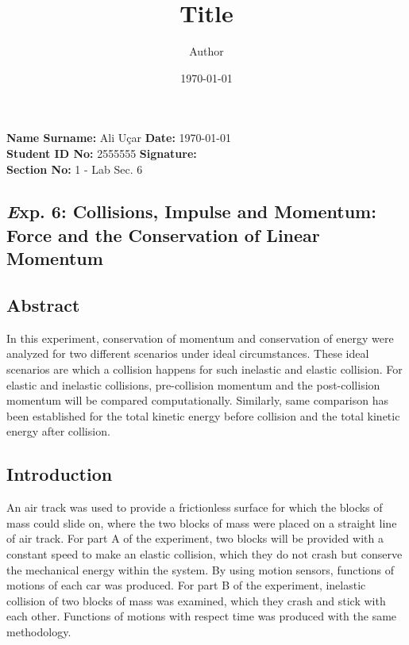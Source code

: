 \documentclass[a4paper, 12pt]{article}
\newcommand{\head}[1]{\section{\normalsize \textit #1}}
\newcommand{\subhead}[1]{\subsection{\normalsize #1}}
\begin{document}
    \title{Title}
    \author{Author}
    \date{\today}

    \noindent
    \textbf{Name Surname:} Ali Uçar
    \hfill \textbf{Date:} \today \\
    \textbf{Student ID No:} 2555555
    \hfill \textbf{Signature:} \\
    \textbf{Section No:} 1 - Lab Sec. 6

    \begin{center}
        \head{Exp. 6: Collisions, Impulse and Momentum: Force and the Conservation of Linear Momentum}
    \end{center}

    \subhead{Abstract}
    In this experiment, conservation of momentum and conservation of energy were analyzed for two
    different scenarios under ideal circumstances. These ideal scenarios are which a collision happens for
    such inelastic and elastic collision. For elastic and inelastic collisions, pre-collision momentum and the
    post-collision momentum will be compared computationally. Similarly, same comparison has been
    established for the total kinetic energy before collision and the total kinetic energy after collision.

    \subhead{Introduction}
    An air track was used to provide a frictionless surface for which the blocks of mass could slide on, 
    where the two blocks of mass were placed on a straight line of air track. For part A of the experiment, 
    two blocks will be provided with a constant speed to make an elastic collision, which they do not crash 
    but conserve the mechanical energy within the system. By using motion sensors, functions of motions 
    of each car was produced. For part B of the experiment, inelastic collision of two blocks of mass was 
    examined, which they crash and stick with each other. Functions of motions with respect time was 
    produced with the same methodology.
\end{document}
